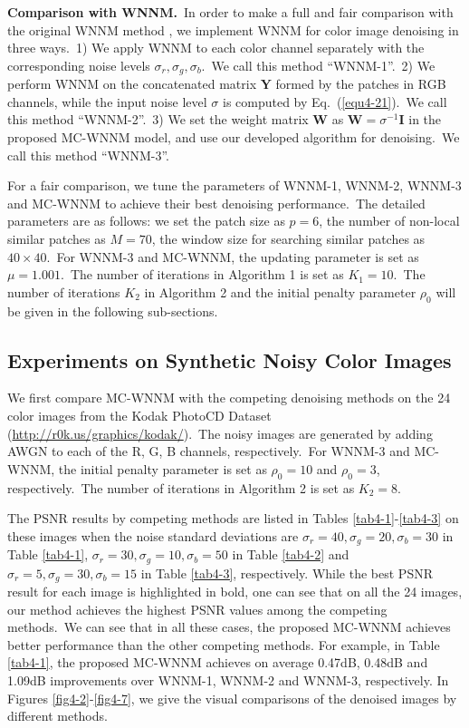\textbf{Comparison with WNNM.}\
In order to make a full and fair comparison with the original WNNM method \cite{wnnmijcv}, we implement WNNM for color image denoising in three ways.\ 
1) We apply WNNM to each color channel separately with the corresponding noise levels $\sigma_{r}, \sigma_{g}, \sigma_{b}$.\ We call this method ``WNNM-1''.\
2) We perform WNNM on the concatenated matrix $\mathbf{Y}$ formed by the patches in RGB channels, while the input noise level $\sigma$ is computed by Eq.\ (\ref{equ4-21}).\ We call this method ``WNNM-2''.\
3) We set the weight matrix $\mathbf{W}$ as $\mathbf{W}=\sigma^{-1}\mathbf{I}$ in the proposed MC-WNNM model, and use our developed algorithm for denoising.\ We call this method ``WNNM-3''.

For a fair comparison, we tune the parameters of WNNM-1, WNNM-2, WNNM-3 and MC-WNNM to achieve their best denoising performance.\ The detailed parameters are as follows: we set the patch size as $p = 6$, the number of non-local similar patches as $M = 70$, the window size for searching similar patches as $40\times40$.\ For WNNM-3 and MC-WNNM, the updating parameter is set as $\mu=1.001$.\ The number of iterations in Algorithm 1 is set as $K_{1} = 10$.\ The number of iterations $K_{2}$ in Algorithm 2 and the initial penalty parameter $\rho_{0}$ will be given in the following sub-sections.



\subsection{Experiments on Synthetic Noisy Color Images}

We first compare MC-WNNM with the competing denoising methods \cite{cbm3d,mlp,tnrd,dncnn,noiseclinic,neatimage} on the 24 color images from the Kodak PhotoCD Dataset (\url{http://r0k.us/graphics/kodak/}).\ The noisy images are generated by adding AWGN to each of the R, G, B channels, respectively.\ For WNNM-3 and MC-WNNM, the initial penalty parameter is set as $\rho_{0}=10$ and $\rho_{0}=3$, respectively.\ The number of iterations in Algorithm 2 is set as $K_{2}=8$. 

The PSNR results by competing methods are listed in Tables \ref{tab4-1}-\ref{tab4-3} on these images when the noise standard deviations are $\sigma_{r}=40, \sigma_{g}=20, \sigma_{b}=30$ in Table \ref{tab4-1}, $\sigma_{r}=30, \sigma_{g}=10, \sigma_{b}=50$ in Table \ref{tab4-2} and $\sigma_{r}=5, \sigma_{g}=30, \sigma_{b}=15$ in Table \ref{tab4-3}, respectively. While the best PSNR result for each image is highlighted in bold, one can see that on all the 24 images, our method achieves the highest PSNR values among the competing methods.\ We can see that in all these cases, the proposed MC-WNNM achieves better performance than the other competing methods. For example, in Table \ref{tab4-1}, the proposed MC-WNNM achieves on average 0.47dB, 0.48dB and 1.09dB improvements over WNNM-1, WNNM-2 and WNNM-3, respectively. In Figures \ref{fig4-2}-\ref{fig4-7}, we give the visual comparisons of the denoised images by different methods.

